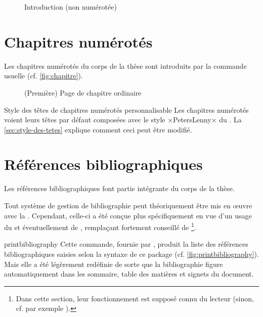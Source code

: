 \begin{figure}[p]
  \centering
  \caption{Introduction (non numérotée)}
  \label{fig:introduction}
\end{figure}

\section{Chapitres numérotés}
\label{sec:chapitres-numerotes}

Les chapitres numérotés du corps de la thèse sont introduits par la commande
usuelle  (cf. \vref{fig:chapitre}).

\begin{figure}[ht]
  \centering
  \caption[Chapitre ordinaire]{(Première) Page de chapitre
    ordinaire}
  \label{fig:chapitre}
\end{figure}

\begin{dbremark}{Style des têtes de chapitres numérotés personnalisable}{}
  Les chapitres numérotés voient leurs têtes par défaut composées avec le style
  ×PetersLenny× du . La \vref{sec:style-des-tetes} explique
  comment ceci peut être modifié.
\end{dbremark}

\section{Références bibliographiques}

Les références bibliographiques font partie intégrante du corps de la thèse.

Tout système de gestion de bibliographie peut théoriquement être mis en œuvre
avec la \yatcl. Cependant, celle-ci a été conçue plus spécifiquement en vue
d'un usage du  et éventuellement de ,
remplaçant fortement conseillé de \footnote{Dans cette section,
  leur fonctionnement est supposé connu du lecteur (sinon, cf. par exemple
  \cite{en-ligne6}).}.

\begin{docCommand}[doc description=\mandatory]{printbibliography}{}
  Cette commande, fournie par , produit la liste des
  références bibliographiques saisies selon la syntaxe de ce package (cf.
  \vref{fig:printbibliography}). Mais elle a été légèrement redéfinie de sorte
  que la bibliographie figure automatiquement dans les sommaire, table des
  matières et signets du document.
\end{docCommand}


